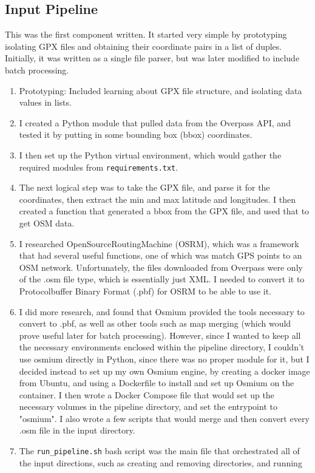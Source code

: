 \documentclass[11pt,a4paper]{report}
\begin{document}
\subsection{Input Pipeline}
This was the first component written. It started very simple by prototyping isolating GPX files and obtaining their coordinate pairs in a list of duples.
Initially, it was written as a single file parser, but was later modified to include batch processing.
\begin{enumerate}
	\item Prototyping: Included learning about GPX file structure, and isolating data values in lists.
	\item I created a Python module that pulled data from the Overpass API, and tested it by putting in some bounding box (bbox) coordinates.
	\item I then set up the Python virtual environment, which would gather the required modules from \texttt{requirements.txt}.
	\item The next logical step was to take the GPX file, and parse it for the coordinates, then extract the min and max latitude and longitudes. I then created
	      a function that generated a bbox from the GPX file, and used that to get OSM data.
	\item I researched OpenSourceRoutingMachine (OSRM), which was a framework that had several useful functions, one of which was match GPS points to
	      an OSM network. Unfortunately, the files downloaded from Overpass were only of the .osm file type, which is essentially just XML. I needed
	      to convert it to Protocolbuffer Binary Format (.pbf) for OSRM to be able to use it.
	\item I did more research, and found that Osmium provided the tools necessary to convert to .pbf, as well as other tools such as map merging (which would prove useful later
	      for batch processing). However, since I wanted to keep all the necessary environments enclosed within the pipeline directory, I couldn't use osmium directly in Python,
	      since there was no proper module for it, but I decided instead to set up my own Osmium engine, by creating a docker image from Ubuntu, and using a Dockerfile to install and set up
	      Osmium on the container. I then wrote a Docker Compose file that would set up the necessary volumes in the pipeline directory, and set the entrypoint to "osmium". I also wrote a few scripts
	      that would merge and then convert every .osm file in the input directory.
	\item The \texttt{run\_pipeline.sh} bash script was the main file that orchestrated all of the input directions, such as creating and removing directories, and running

\end{enumerate}
\end{document}
